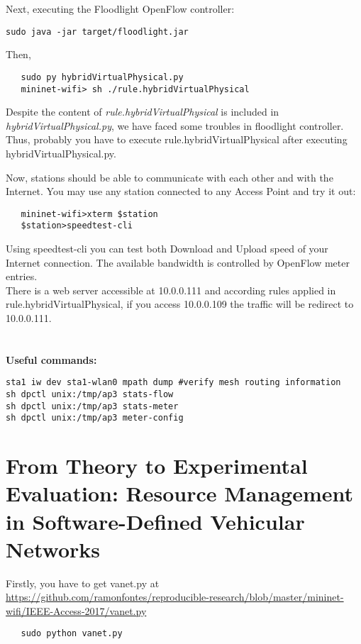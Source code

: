\noindent Next, executing the Floodlight OpenFlow controller: 
\begin{verbatim}
sudo java -jar target/floodlight.jar
\end{verbatim}

\noindent Then,
\begin{verbatim}
   sudo py hybridVirtualPhysical.py
   mininet-wifi> sh ./rule.hybridVirtualPhysical
\end{verbatim}

Despite the content of \textit{rule.hybridVirtualPhysical} is included in \textit{hybridVirtualPhysical.py}, we have faced some troubles in floodlight controller. Thus, probably you have to execute rule.hybridVirtualPhysical after executing hybridVirtualPhysical.py.

Now, stations should be able to communicate with each other and with the Internet. You may use any station connected to any Access Point and try it out:
\begin{verbatim}
   mininet-wifi>xterm $station 
   $station>speedtest-cli
\end{verbatim}
Using speedtest-cli you can test both Download and Upload speed of your Internet connection. The available bandwidth is controlled by OpenFlow meter entries.\\

\noindent There is a web server accessible at 10.0.0.111 and according rules applied in rule.hybridVirtualPhysical, if you access 10.0.0.109 the traffic will be redirect to 10.0.0.111.\\
\\
\\
\textbf{Useful commands:}
\begin{verbatim}
sta1 iw dev sta1-wlan0 mpath dump #verify mesh routing information
sh dpctl unix:/tmp/ap3 stats-flow
sh dpctl unix:/tmp/ap3 stats-meter
sh dpctl unix:/tmp/ap3 meter-config
\end{verbatim}

\section{From Theory to Experimental Evaluation: Resource Management in Software-Defined Vehicular Networks}

Firstly, you have to get vanet.py at \url{https://github.com/ramonfontes/reproducible-research/blob/master/mininet-wifi/IEEE-Access-2017/vanet.py}

\begin{verbatim}
   sudo python vanet.py
\end{verbatim}

